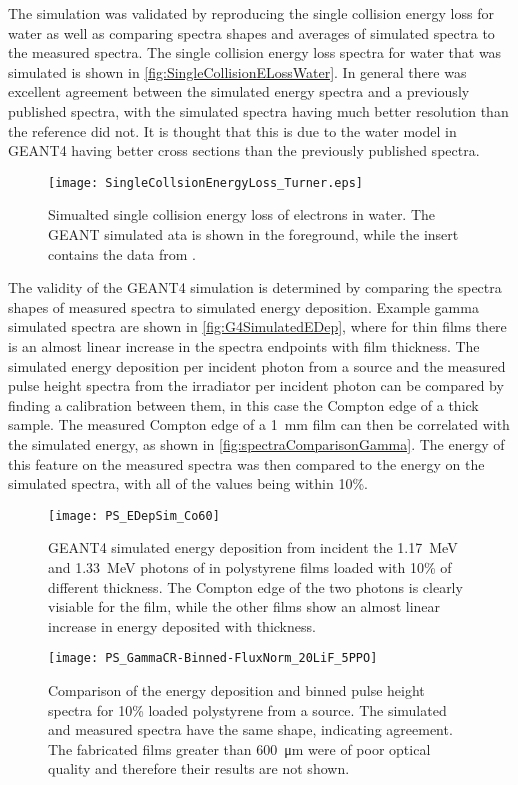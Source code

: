 The simulation was validated by reproducing the single collision energy loss for water as well as comparing spectra shapes and averages of simulated spectra to the measured spectra.
The single collision energy loss spectra for water that was simulated is shown in \autoref{fig:SingleCollisionELossWater}.
In general there was excellent agreement between the simulated energy spectra and a previously published spectra\cite{turner_comparative_1982}, with the simulated spectra having much better resolution than the reference did not.
It is thought that this is due to the water model in GEANT4 having better cross sections than the previously published spectra.
\begin{figure}
  \centering
  \texttt{[image: SingleCollsionEnergyLoss\_Turner.eps]}
  \caption[Single Collision Energy Loss of Water]{Simualted single collision energy loss of electrons in water. The GEANT simulated ata is shown in the foreground, while the insert contains the data from \cite{turner_comparative_1982}.}
	\label{fig:SingleCollisionELossWater}
\end{figure}

The validity of the GEANT4 simulation is determined by comparing the spectra shapes of measured spectra to simulated energy deposition.
Example gamma simulated spectra are shown in \autoref{fig:G4SimulatedEDep}, where for thin films there is an almost linear increase in the spectra endpoints with film thickness.
The simulated energy deposition per incident photon from a  source and the measured pulse height spectra from the  irradiator per incident photon can be compared by finding a calibration between them, in this case the Compton edge of a thick sample.
The measured Compton edge of a \SI{1}{\mm} film can then be correlated with the simulated energy, as shown in \autoref{fig:spectraComparisonGamma}.
The energy of this feature on the measured spectra was then compared to the energy on the simulated spectra, with all of the values being within 10\%.
\begin{figure}
	\centering
    	\texttt{[image: PS\_EDepSim\_Co60]}
	\caption[GEANT4 Simulated Gamma Spectra in PS]{GEANT4 simulated energy deposition from incident the \SI{1.17}{\MeV} and \SI{1.33}{\MeV} photons of  in polystyrene films loaded with 10\%  of different thickness. The Compton edge of the two photons is clearly visiable for the  film, while the other films show an almost linear increase in energy deposited with thickness.}
	\label{fig:G4SimulatedEDep}
\end{figure}
\begin{figure}
	\centering
   	\texttt{[image: PS\_GammaCR-Binned-FluxNorm\_20LiF\_5PPO]}
	\caption{Comparison of the energy deposition and binned pulse height spectra for 10\% loaded polystyrene from a  source. The simulated and measured spectra have the same shape, indicating agreement. The fabricated films greater than \SI{600}{\um} were of poor optical quality and therefore their results are not shown. }
	\label{fig:spectraComparisonGamma}
\end{figure}

